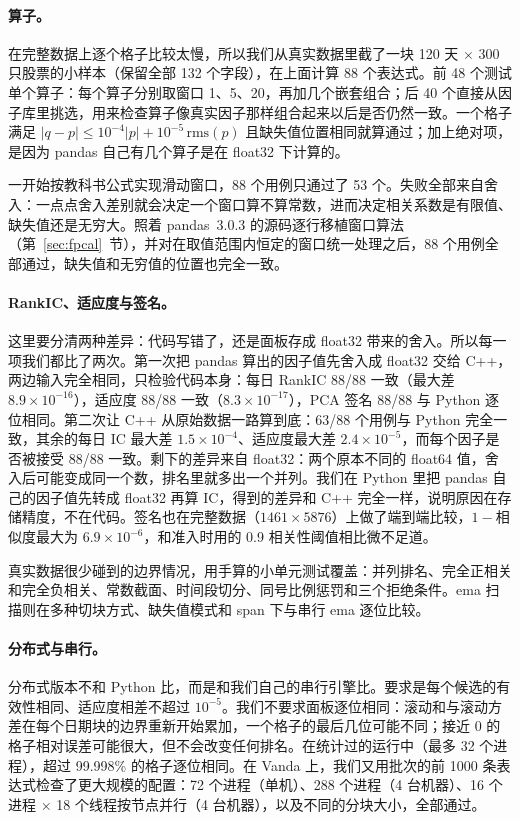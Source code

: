 \documentclass[11pt,a4paper,UTF8,fontset=fandol]{ctexart}
\begin{document}
\paragraph{算子。}在完整数据上逐个格子比较太慢，所以我们从真实数据里截了一块 120 天 $\times$ 300 只股票的小样本（保留全部 132 个字段），在上面计算 88 个表达式。前 48 个测试单个算子：每个算子分别取窗口 1、5、20，再加几个嵌套组合；后 40 个直接从因子库里挑选，用来检查算子像真实因子那样组合起来以后是否仍然一致。一个格子满足 $|q-p|\le 10^{-4}|p| + 10^{-5}\,\mathrm{rms}(p)$ 且缺失值位置相同就算通过；加上绝对项，是因为 pandas 自己有几个算子是在 float32 下计算的。

一开始按教科书公式实现滑动窗口，88 个用例只通过了 53 个。失败全部来自舍入：一点点舍入差别就会决定一个窗口算不算常数，进而决定相关系数是有限值、缺失值还是无穷大。照着 pandas~3.0.3 的源码逐行移植窗口算法（第~\ref{sec:fpcal}~节），并对在取值范围内恒定的窗口统一处理之后，88 个用例全部通过，缺失值和无穷值的位置也完全一致。

\paragraph{RankIC、适应度与签名。}这里要分清两种差异：代码写错了，还是面板存成 float32 带来的舍入。所以每一项我们都比了两次。第一次把 pandas 算出的因子值先舍入成 float32 交给 C++，两边输入完全相同，只检验代码本身：每日 RankIC 88/88 一致（最大差 $8.9\times10^{-16}$），适应度 88/88 一致（$8.3\times10^{-17}$），PCA 签名 88/88 与 Python 逐位相同。第二次让 C++ 从原始数据一路算到底：63/88 个用例与 Python 完全一致，其余的每日 IC 最大差 $1.5\times10^{-4}$、适应度最大差 $2.4\times10^{-5}$，而每个因子是否被接受 88/88 一致。剩下的差异来自 float32：两个原本不同的 float64 值，舍入后可能变成同一个数，排名里就多出一个并列。我们在 Python 里把 pandas 自己的因子值先转成 float32 再算 IC，得到的差异和 C++ 完全一样，说明原因在存储精度，不在代码。签名也在完整数据（$1461\times5876$）上做了端到端比较，$1-$相似度最大为 $6.9\times10^{-6}$，和准入时用的 0.9 相关性阈值相比微不足道。

真实数据很少碰到的边界情况，用手算的小单元测试覆盖：并列排名、完全正相关和完全负相关、常数截面、时间段切分、同号比例惩罚和三个拒绝条件。ema 扫描则在多种切块方式、缺失值模式和 span 下与串行 ema 逐位比较。

\paragraph{分布式与串行。}分布式版本不和 Python 比，而是和我们自己的串行引擎比。要求是每个候选的有效性相同、适应度相差不超过 $10^{-5}$。我们不要求面板逐位相同：滚动和与滚动方差在每个日期块的边界重新开始累加，一个格子的最后几位可能不同；接近 0 的格子相对误差可能很大，但不会改变任何排名。在统计过的运行中（最多 32 个进程），超过 99.998\% 的格子逐位相同。在 Vanda 上，我们又用批次的前 1000 条表达式检查了更大规模的配置：72 个进程（单机）、288 个进程（4 台机器）、16 个进程 $\times$ 18 个线程按节点并行（4 台机器），以及不同的分块大小，全部通过。
\end{document}
